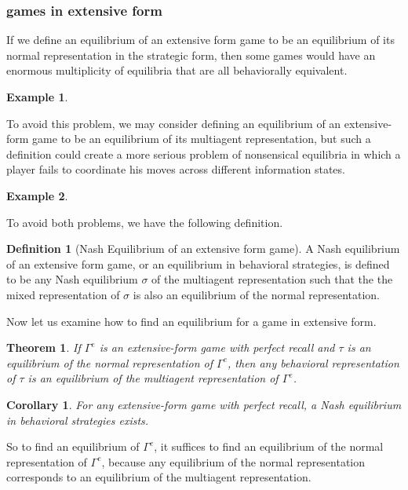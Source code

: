 \documentclass{article}
\newtheorem{Thm}{Theorem}[section]
\newtheorem{Cor}{Corollary}[Thm]
\newtheorem{Eg}{Example}[section]
\theoremstyle{definition}
\newtheorem{Def}{Definition}[section]
\begin{document}
\subsubsection{games in extensive form}
If we define an equilibrium of an extensive form game to be an equilibrium of its normal representation in the strategic form, then some
games would have an enormous multiplicity of equilibria that are all behaviorally equivalent.
\begin{Eg}
    
\end{Eg}
To avoid this problem, we may consider defining an equilibrium of an extensive-form game to be an equilibrium of its multiagent representation,
but such a definition could create a more serious problem of nonsensical equilibria in which a player fails to coordinate his moves across
different information states.
\begin{Eg}
    
\end{Eg}
To avoid both problems, we have the following definition.
\begin{Def}[Nash Equilibrium of an extensive form game]
    A Nash equilibrium of an extensive form game, or an equilibrium in behavioral strategies, is defined to be any Nash equilibrium $\sigma$ of the multiagent representation
    such that the the mixed representation of $\sigma$ is also an equilibrium of the normal representation.
\end{Def}
Now let us examine how to find an equilibrium for a game in extensive form.
\begin{Thm}
    If $\Gamma^e$ is an extensive-form game with perfect recall and $\tau$ is an equilibrium of the normal representation of $\Gamma^e$,
    then any behavioral representation of $\tau$ is an equilibrium of the multiagent representation of $\Gamma^e$.
\end{Thm}
\begin{Cor}
    For any extensive-form game with perfect recall, a Nash equilibrium in behavioral strategies exists.
\end{Cor}
So to find an equilibrium of $\Gamma^e$, it suffices to find an equilibrium of the normal representation of $\Gamma^e$,
because any equilibrium of the normal representation corresponds to an equilibrium of the multiagent representation.
\end{document}
